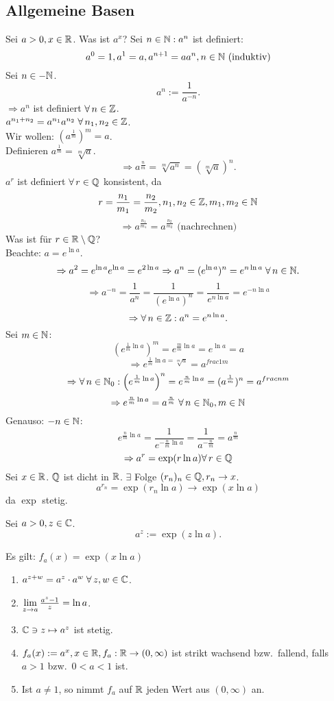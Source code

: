 \documentclass[../ana2.tex]{subfiles}
\begin{document}
\subsection*{Allgemeine Basen}
Sei \( a > 0, x\in\mathbb{R} \). Was ist \( a^x \)?
Sei \( n \in \mathbb{N}: a^n \) ist definiert:
\[ a^0 = 1, a^1 = a, a^{n+1} = aa^n, n \in \mathbb{N} \text{ (induktiv)} \]
Sei \( n \in -\mathbb{N} \). 
\[ a^n := \frac{1}{a^{-n}}. \]
\( \Rightarrow a^n \) ist definiert \( \forall n\in\Z \).\\
\( a^{n_1 + n_2} = a^{n_1} a^{n_2} \;\forall n_1, n_2 \in\Z \).\\
Wir wollen: \( (a^\frac{1}{m})^m = a \).\\
Definieren \( a^{\frac{1}{m}} = \sqrt[m]{a} \).
\[ \Rightarrow a^{\frac{n}{m}} = \sqrt[m]{a^n} 
= (\sqrt[m]{a})^n. \]
\( a^r \) ist definiert \( \forall r \in \Q \) konsistent, da
\[ r = \frac{n_1}{m_1} = \frac{n_2}{m_2}
, n_1,n_2 \in \mathbb{Z}, m_1,m_2 \in \mathbb{N} \]
\[ \Rightarrow a^{\frac{n_1}{m_1}} = a^{\frac{n_2}{m_2}} 
\text{ (nachrechnen)} \]
Was ist für \( r\in \mathbb{R} \setminus \mathbb{Q} \)?\\
Beachte: \( a = e^{\ln a} \). 
\[ \Rightarrow a^2 = e^{\ln a} e^{\ln a} = e^{2\ln a}
\Rightarrow a^n = (e^{\ln a})^n = e^{n\ln a} \;\forall n\in\N. \]
\[ \Rightarrow a^{-n} = \frac{1}{a^n} = \frac{1}{(e^{\ln a})^n}
= \frac{1}{e^{n\ln a}} = e^{-n\ln a} \]
\[ \Rightarrow \forall n\in\Z: a^n = e^{n \ln a}. \]
Sei \( m \in \mathbb{N} \):
\[ \left( e^{\frac{1}{m} \ln a} \right)^m = e^{\frac{m}{m} \ln a}
= e^{\ln a} = a \]
\[ \Rightarrow e^{\frac{1}{m} \ln a = \sqrt[m]{a}} = a^{frac{1}{m}} \]
\[ \Rightarrow \forall n\in\N_0: 
\left( e^{\frac{1}{m} \ln a} \right)^n 
= e^{\frac{n}{m} \ln a} = (a^{\frac{1}{m}})^n = a^{frac{n}{m}} \]
\[ \Rightarrow e^{\frac{n}{m} \ln a} = a^{\frac{n}{m}} \;\forall n \in \N_0, m \in \N \]
Genauso: \( -n \in \mathbb{N} \):
\[ e^{\frac{n}{m} \ln a} = \frac{1}{e^{-\frac{n}{m} \ln a}}
= \frac{1}{a^{-\frac{n}{m}}} = a^{\frac{n}{m}} \]
\[ \Rightarrow a^r = \exp(r \ln a) \forall r \in \Q \]
Sei \( x\in\mathbb{R} \). \( \mathbb{Q} \) ist dicht in \( \mathbb{R} \). 
\( \exists \) Folge \( (r_n)_n \in \mathbb{Q}, r_n \rightarrow x \).\\
\[ a^{r_n} = \exp(r_n \ln a) \rightarrow \exp(x\ln a) \]
da \( \exp \) stetig.
\begin{defi}
    Sei \( a > 0, z\in\mathbb{C} \).
    \[ a^z := \exp(z \ln a). \]
\end{defi}
Es gilt: \( f_a(x) = \exp(x\ln a) \)
\begin{enumerate}
    \item \( a^{z+w} = a^z \cdot a^w \;\forall z,w \in \C \).
    \item \( \lim\limits_{z\rightarrow{}a} \frac{a^z -1}{z} = \ln a \).
    \item \( \mathbb{C} \ni z \mapsto a^z \) ist stetig.
    \item \( f_a(x) := a^x, x\in \mathbb{R}, f_a : \mathbb{R} \rightarrow (0,\infty) \)
    ist strikt wachsend bzw.\ fallend, falls
    \( a > 1 \) bzw.\  \( 0 < a < 1 \)
    ist.
    \item Ist \(a \neq 1 \), so nimmt \( f_a \) auf \( \mathbb{R} \) jeden Wert aus
    \( (0, \infty) \) an.
\end{enumerate}
\end{document}
